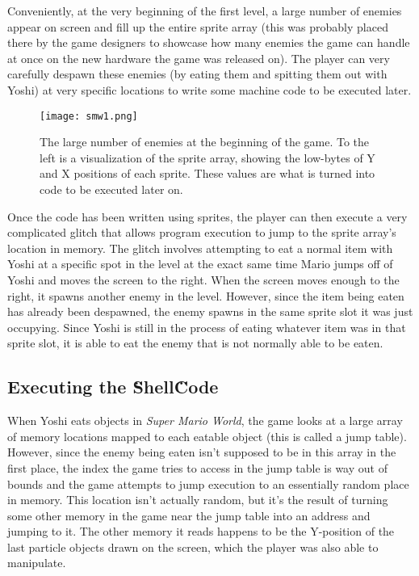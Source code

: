 Conveniently, at the very beginning of the first level, a large number of enemies appear on screen and fill up the entire sprite array (this was probably placed there by the game designers to showcase how many enemies the game can handle at once on the new hardware the game was released on). The player can very carefully despawn these enemies (by eating them and spitting them out with Yoshi) at very specific locations to write some machine code to be executed later.

\begin{figure}
\texttt{[image: smw1.png]}
\caption{The large number of enemies at the beginning of the game. To the left is a visualization of the sprite array, showing the low-bytes of Y and X positions of each sprite. These values are what is turned into code to be executed later on. \cite{dotsarecool_2015}}
\end{figure}

Once the code has been written using sprites, the player can then execute a very complicated glitch that allows program execution to jump to the sprite array’s location in memory. The glitch involves attempting to eat a normal item with Yoshi at a specific spot in the level at the exact same time Mario jumps off of Yoshi and moves the screen to the right. When the screen moves enough to the right, it spawns another enemy in the level. However, since the item being eaten has already been despawned, the enemy spawns in the same sprite slot it was just occupying. Since Yoshi is still in the process of eating whatever item was in that sprite slot, it is able to eat the enemy that is not normally able to be eaten.

\subsection{Executing the \"Shell\" Code}

When Yoshi eats objects in \textit{Super Mario World}, the game looks at a large array of memory locations mapped to each eatable object (this is called a jump table). However, since the enemy being eaten isn’t supposed to be in this array in the first place, the index the game tries to access in the jump table is way out of bounds and the game attempts to jump execution to an essentially random place in memory. This location isn’t actually random, but it’s the result of turning some other memory in the game near the jump table into an address and jumping to it. The other memory it reads happens to be the Y-position of the last particle objects drawn on the screen, which the player was also able to manipulate.

